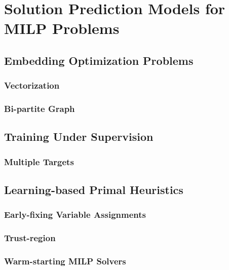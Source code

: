 

\chapter{Solution Prediction Models for MILP Problems}\label{chap:solution-prediction}

\section{Embedding Optimization Problems}

\subsection{Vectorization}

\subsection{Bi-partite Graph}

\section{Training Under Supervision}

\subsection{Multiple Targets}

\section{Learning-based Primal Heuristics}

\subsection{Early-fixing Variable Assignments}

\subsection{Trust-region}

\subsection{Warm-starting MILP Solvers}

